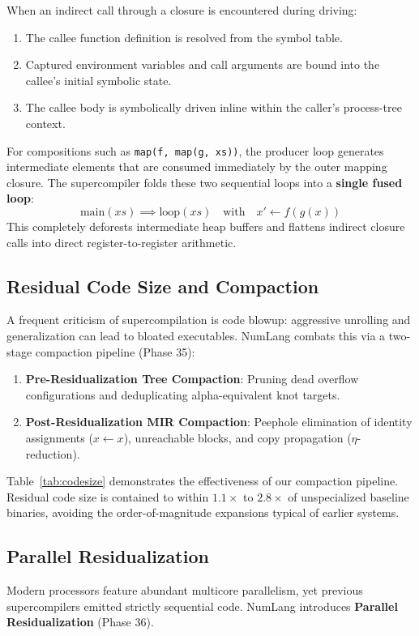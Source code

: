 When an indirect call through a closure is encountered during driving:
\begin{enumerate}
    \item The callee function definition is resolved from the symbol table.
    \item Captured environment variables and call arguments are bound into the callee's initial symbolic state.
    \item The callee body is symbolically driven inline within the caller's process-tree context.
\end{enumerate}
For compositions such as \texttt{map(f, map(g, xs))}, the producer loop generates intermediate elements that are consumed immediately by the outer mapping closure. The supercompiler folds these two sequential loops into a \textbf{single fused loop}:
\begin{equation}
\text{main}(xs) \implies \text{loop}(xs) \quad \text{with} \quad x' \leftarrow f(g(x))
\end{equation}
This completely deforests intermediate heap buffers and flattens indirect closure calls into direct register-to-register arithmetic.

\subsection{Residual Code Size and Compaction}
\label{sec:opt:codesize}
A frequent criticism of supercompilation is code blowup: aggressive unrolling and generalization can lead to bloated executables. NumLang combats this via a two-stage compaction pipeline (Phase 35):
\begin{enumerate}
    \item \textbf{Pre-Residualization Tree Compaction}: Pruning dead overflow configurations and deduplicating alpha-equivalent knot targets.
    \item \textbf{Post-Residualization MIR Compaction}: Peephole elimination of identity assignments ($x \leftarrow x$), unreachable blocks, and copy propagation ($\eta$-reduction).
\end{enumerate}



Table~\ref{tab:codesize} demonstrates the effectiveness of our compaction pipeline. Residual code size is contained to within $1.1\times$ to $2.8\times$ of unspecialized baseline binaries, avoiding the order-of-magnitude expansions typical of earlier systems.

\subsection{Parallel Residualization}
\label{sec:opt:parallel}
Modern processors feature abundant multicore parallelism, yet previous supercompilers emitted strictly sequential code. NumLang introduces \textbf{Parallel Residualization} (Phase 36).

